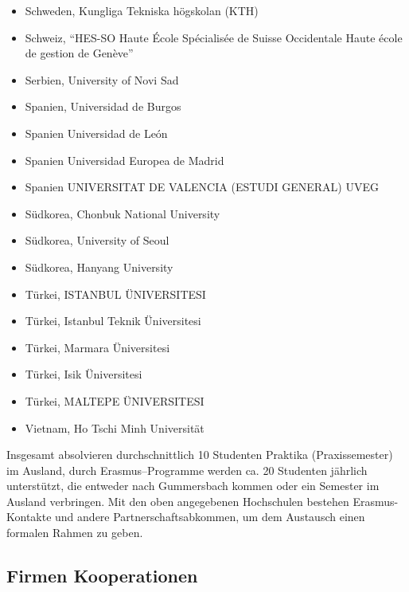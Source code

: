 \begin{itemize}
\item
  Schweden, Kungliga Tekniska högskolan (KTH)
\item
  Schweiz, ``HES-SO Haute École Spécialisée de Suisse Occidentale Haute
  école de gestion de Genève''
\item
  Serbien, University of Novi Sad\\
\item
  Spanien, Universidad de Burgos
\item
  Spanien Universidad de León
\item
  Spanien Universidad Europea de Madrid
\item
  Spanien UNIVERSITAT DE VALENCIA (ESTUDI GENERAL) UVEG
\item
  Südkorea, Chonbuk National University\\
\item
  Südkorea, University of Seoul\\
\item
  Südkorea, Hanyang University\\
\item
  Türkei, ISTANBUL ÜNIVERSITESI\\
\item
  Türkei, Istanbul Teknik Üniversitesi\\
\item
  Türkei, Marmara Üniversitesi
\item
  Türkei, Isik Üniversitesi
\item
  Türkei, MALTEPE ÜNIVERSITESI
\item
  Vietnam, Ho Tschi Minh Universität
\end{itemize}

Insgesamt absolvieren durchschnittlich 10 Studenten Praktika
(Praxissemester) im Ausland, durch Erasmus--Programme werden ca. 20
Studenten jährlich unterstützt, die entweder nach Gummersbach kommen
oder ein Semester im Ausland verbringen. Mit den oben angegebenen
Hochschulen bestehen Erasmus-Kontakte und andere Partnerschaftsabkommen,
um dem Austausch einen formalen Rahmen zu geben.

\subsection{Firmen
Kooperationen\label{/mi-2017/selbstbericht/0700-studiengangsbezogene-kooperationen/0000-studiengangsbezogene-kooperationen}}\label{firmen-kooperationenpathlabelmi-2017selbstbericht0700-studiengangsbezogene-kooperationen0000-studiengangsbezogene-kooperationen}

